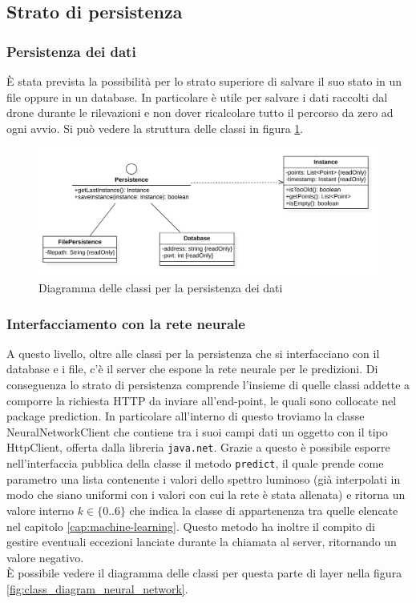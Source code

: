 \subsection{Strato di persistenza}

\subsubsection{Persistenza dei dati}
È stata prevista la possibilità per lo strato superiore di salvare il suo stato in un file oppure in un database. In particolare è utile per salvare i dati raccolti dal drone durante le rilevazioni e non dover ricalcolare tutto il percorso da zero ad ogni avvio. Si può vedere la struttura delle classi in figura \ref{fig:class_diagram_persistence}.

\begin{figure}
    \centering
    \includegraphics[width=\textwidth]{immagini/persistence_classes.png}
    \caption{Diagramma delle classi per la persistenza dei dati}
    \label{fig:class_diagram_persistence}
\end{figure}

\subsubsection{Interfacciamento con la rete neurale}
A questo livello, oltre alle classi per la persistenza che si interfacciano con il database e i file, c'è il server che espone la rete neurale per le predizioni. Di conseguenza lo strato di persistenza comprende l'insieme di quelle classi addette a comporre la richiesta HTTP da inviare all'end-point, le quali sono collocate nel package prediction. In particolare all'interno di questo troviamo la classe NeuralNetworkClient che contiene tra i suoi campi dati un oggetto con il tipo HttpClient, offerta dalla libreria \verb|java.net|. Grazie a questo è possibile esporre nell'interfaccia pubblica della classe il metodo \verb|predict|, il quale prende come parametro una lista contenente i valori dello spettro luminoso (già interpolati in modo che siano uniformi con i valori con cui la rete è stata allenata) e ritorna un valore interno $k \in \{0 .. 6 \}$ che indica la classe di appartenenza tra quelle elencate nel capitolo \ref{cap:machine-learning}. Questo metodo ha inoltre il compito di gestire eventuali eccezioni lanciate durante la chiamata al server, ritornando un valore negativo.\\
È possibile vedere il diagramma delle classi per questa parte di layer nella figura \ref{fig:class_diagram_neural_network}.

